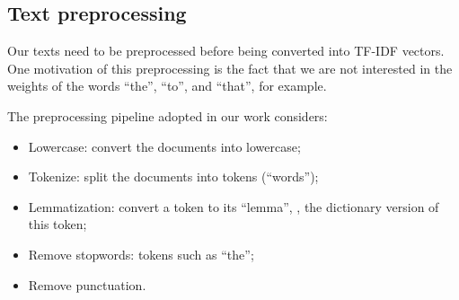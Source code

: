 \subsection{Text preprocessing}

    Our texts need to be preprocessed before being converted into TF-IDF vectors. One motivation of this preprocessing is the fact that we are not interested in the weights of the words ``the'', ``to'', and ``that'', for example.

    The preprocessing pipeline adopted in our work considers:
    \begin{itemize}
    \item Lowercase: convert the documents into lowercase;
    \item Tokenize: split the documents into tokens (``words'');
    \item Lemmatization: convert a token to its ``lemma'', \ie, the dictionary version of this token;
    \item Remove stopwords: tokens such as ``the'';
    \item Remove punctuation.
    \end{itemize}
